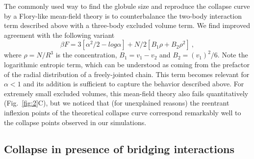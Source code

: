 \documentclass[
preprint,
a4paper,
12pt,
superscriptaddress,
pre]{revtex4}
\begin{document}
% 
The commonly used way to find the globule size and reproduce the
collapse curve by a Flory-like mean-field theory is to counterbalance
the two-body interaction term described above with a three-body
excluded volume term. We find improved agreement with the following
variant~\cite{DeGennes1975}
  \begin{equation}
    \beta F = 3 [\alpha^2/2 - log \alpha] + N/2 [B_1 \rho  + B_2 \rho^2 ] \ ,
    \label{eq:deg_mfield}
\end{equation}
where $\rho = N/R^3$ is the concentration, $B_1 = v_1 - v_2$ and $B_2
= (v_1)^2 / 6$. Note the logarithmic entropic term, which can be
understood as coming from the prefactor of the radial distribution of
a freely-jointed chain.
%
%
This term becomes relevant for $\alpha < 1$ and its
addition is sufficient to capture the behavior described above.  For
extremely small excluded volumes, this mean-field theory also fails
quantitatively (Fig.~\ref{fig:2}C), but we noticed that (for
unexplained reasons) the reentrant inflexion points of the theoretical
collapse curve correspond remarkably well to the collapse points
observed in our simulations.



%
%
%


\subsection*{Collapse in presence of bridging interactions}
\end{document}
